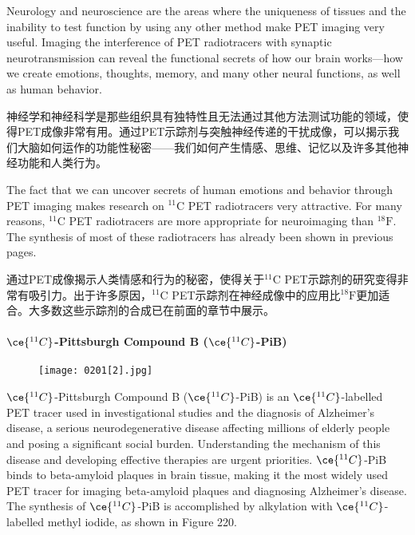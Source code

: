 \documentclass[dvipsnames, svgnames,a4paper,11pt]{article}
\begin{document}
Neurology and neuroscience are the areas where the uniqueness of tissues and the inability to test function by using any other method make PET imaging very useful. Imaging the interference of PET radiotracers with synaptic neurotransmission can reveal the functional secrets of how our brain works—how we create emotions, thoughts, memory, and many other neural functions, as well as human behavior.  

神经学和神经科学是那些组织具有独特性且无法通过其他方法测试功能的领域，使得PET成像非常有用。通过PET示踪剂与突触神经传递的干扰成像，可以揭示我们大脑如何运作的功能性秘密——我们如何产生情感、思维、记忆以及许多其他神经功能和人类行为。  


The fact that we can uncover secrets of human emotions and behavior through PET imaging makes research on \(\mathrm{^{11}C}\) PET radiotracers very attractive. For many reasons, \(\mathrm{^{11}C}\) PET radiotracers are more appropriate for neuroimaging than \(\mathrm{^{18}F}\). The synthesis of most of these radiotracers has already been shown in previous pages.

通过PET成像揭示人类情感和行为的秘密，使得关于\(\mathrm{^{11}C}\) PET示踪剂的研究变得非常有吸引力。出于许多原因，\(\mathrm{^{11}C}\) PET示踪剂在神经成像中的应用比\(\mathrm{^{18}F}\)更加适合。大多数这些示踪剂的合成已在前面的章节中展示。

\paragraph{\(\ce{^{11}C}\)-Pittsburgh Compound B (\(\ce{^{11}C}\)-PiB)} 

\begin{wrapfigure}{r}{0.35\textwidth}
    \centering
    \texttt{[image: 0201[2].jpg]}
 \label{fig245}
\end{wrapfigure}

\(\ce{^{11}C}\)-Pittsburgh Compound B (\(\ce{^{11}C}\)-PiB) is an \(\ce{^{11}C}\)-labelled PET tracer used in investigational studies and the diagnosis of Alzheimer's disease, a serious neurodegenerative disease affecting millions of elderly people and posing a significant social burden. Understanding the mechanism of this disease and developing effective therapies are urgent priorities. \(\ce{^{11}C}\)-PiB binds to beta-amyloid plaques in brain tissue, making it the most widely used PET tracer for imaging beta-amyloid plaques and diagnosing Alzheimer's disease. The synthesis of \(\ce{^{11}C}\)-PiB is accomplished by alkylation with \(\ce{^{11}C}\)-labelled methyl iodide, as shown in Figure 220.
\end{document}
